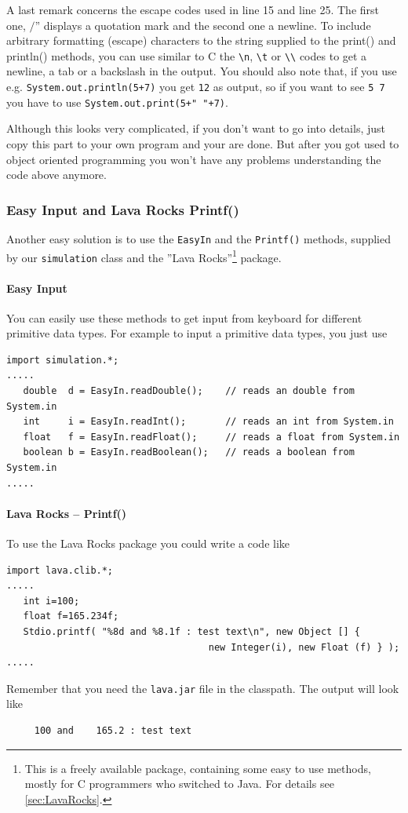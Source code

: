 A last remark concerns the escape codes used in line 15 and line 25.
The first one, $/$'' displays a quotation mark and the second
one a newline.
To include arbitrary formatting (escape) characters
to the string supplied to the print() and println() methods, you
can use similar to C the \verb|\n|, \verb|\t| or \verb|\\| codes
to get a newline, a tab or a backslash in the output. You should 
also note that, if you use e.g. \verb|System.out.println(5+7)| you
get \verb|12| as output, so if you want to see \verb|5 7| you have
to use \verb|System.out.print(5+" "+7)|.

Although this looks very complicated, if you don't want to go into
details, just copy this part to your own program and your are done.
But after you got used to object oriented programming you won't have
any problems understanding the code above anymore.

\subsubsection{Easy Input and Lava Rocks Printf()}
Another easy solution is to use the \verb|EasyIn| and the
\verb|Printf()| methods, supplied by our \verb|simulation| class
and the ''Lava Rocks''\footnote{This is a freely available package,
containing some easy to use methods, mostly for C programmers
who switched to Java. For details see \ref{sec:LavaRocks}.} package.

\paragraph{Easy Input}
You can easily use these methods to get input from keyboard
for different primitive data types. For example to input
a primitive data types, you just use
\begin{verbatim}
import simulation.*;
.....
   double  d = EasyIn.readDouble();    // reads an double from System.in
   int     i = EasyIn.readInt();       // reads an int from System.in
   float   f = EasyIn.readFloat();     // reads a float from System.in
   boolean b = EasyIn.readBoolean();   // reads a boolean from System.in
.....
\end{verbatim}

\paragraph{Lava Rocks -- Printf()}
To use the Lava Rocks package you could write a code like
\begin{verbatim}
import lava.clib.*;
.....
   int i=100;
   float f=165.234f;
   Stdio.printf( "%8d and %8.1f : test text\n", new Object [] { 
                                    new Integer(i), new Float (f) } );
.....                 
\end{verbatim}
Remember that you need the \verb|lava.jar| file in the classpath.
The output will look like
\begin{verbatim}
     100 and    165.2 : test text
\end{verbatim}

